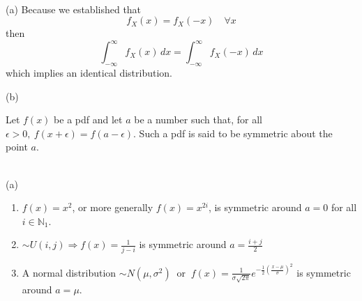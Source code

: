 \documentclass[12pt,letterpaper]{exam}
\begin{document}
\begin{questions}
	\begin{solution}\\
		(a)
		Because we established that
		\[f_X(x) = f_X(-x)\quad \forall x\]
		then
		\[ \int_{-\infty}^{\infty} f_X(x) \,dx = \int_{-\infty}^{\infty} f_X(-x) \,dx \]
		which implies an identical distribution.
		
		(b)
		
	\end{solution}
	
	\question  Let $f(x)$ be a pdf and let $a$ be a number such that, for all $\epsilon > 0, \ f(x+\epsilon) = f(a-\epsilon)$. Such a pdf is said to be symmetric about the point $a$.
	
	\begin{solution}\\
		(a)
		\begin{enumerate}
			\item $f(x) = x^2$, or more generally $f(x) = x^{2i}$, is symmetric around $a=0$ for all $i\in\mathbb{N}_1$.
			\item $\sim U(i,j) \Rightarrow f(x) = \frac{1}{j-i}$ is symmetric around $a=\frac{i+j}{2}$
			\item A normal distribution $\sim N(\mu,\sigma^2)\ $ or $\ f(x) = \frac{1}{\sigma\sqrt{2\pi}}e^{-\frac{1}{2}\left(\frac{x-\mu}{\sigma}\right)^2}$
			is symmetric around $a=\mu$.
		\end{enumerate}
		

\end{solution}
\end{questions}
\end{document}
